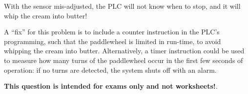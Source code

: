 \vfil \eject







With the sensor mis-adjusted, the PLC will not know when to stop, and it will whip the cream into butter!

\vskip 10pt

A ``fix'' for this problem is to include a counter instruction in the PLC's programming, such that the paddlewheel is limited in run-time, to avoid whipping the cream into butter.  Alternatively, a timer instruction could be used to measure how many turns of the paddlewheel occur in the first few seconds of operation: if no turns are detected, the system shuts off with an alarm.







{\bf This question is intended for exams only and not worksheets!}.


